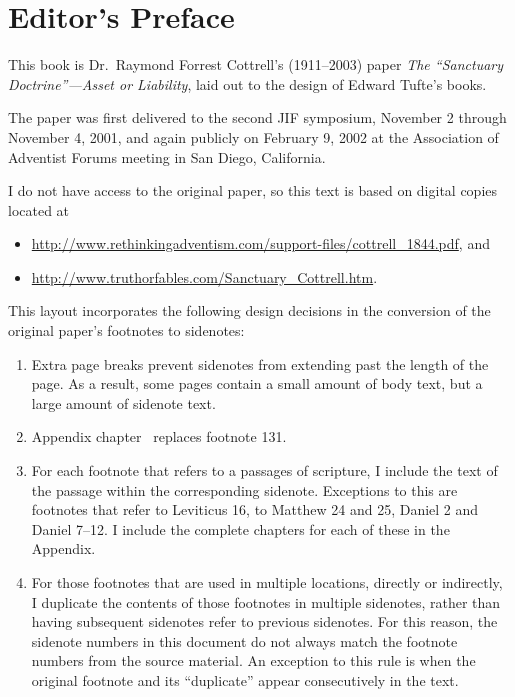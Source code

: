 \chapter{Editor's Preface}
\label{ch:editor}

\begin{fullwidth}
This book is Dr.\ Raymond Forrest Cottrell's (1911--2003) paper \textit{The ``Sanctuary Doctrine''---Asset 
or Liability}, laid out to the design of Edward Tufte's books.  

The paper was first delivered to the second JIF symposium, November 2 through 
November 4, 2001, and again publicly on February 9, 2002 at the Association of 
Adventist Forums meeting in San Diego, California.

I do not have access to the original paper, so this text is based on digital copies
located at
\begin{itemize}
    \item \url{http://www.rethinkingadventism.com/support-files/cottrell_1844.pdf}, and
    \item \url{http://www.truthorfables.com/Sanctuary_Cottrell.htm}.
\end{itemize}

This layout incorporates the following design decisions in the conversion of
the original paper's footnotes to sidenotes:
\begin{enumerate}
    \item Extra page breaks prevent sidenotes from extending past the 
    length of the page. As a result, some pages contain a small amount of body
    text, but a large amount of sidenote text.
    \item Appendix chapter~ replaces footnote 131.
    \item For each footnote that refers to a passages of scripture, I include
    the text of the passage within the corresponding sidenote.  Exceptions
    to this are footnotes that refer to Leviticus 16, to Matthew 24 and 25,
    Daniel 2 and Daniel 7--12. I include the complete chapters for each
    of these in the Appendix.
    \item For those footnotes that are used in multiple locations, directly or 
    indirectly, I duplicate the contents of those footnotes in 
    multiple sidenotes, rather than having subsequent sidenotes refer to
    previous sidenotes. For this reason, the sidenote numbers in this document
    do not always match the footnote numbers from the source material.
    An exception to this rule is when the original
    footnote and its ``duplicate'' appear consecutively in the text.
\end{enumerate}


\end{fullwidth}
